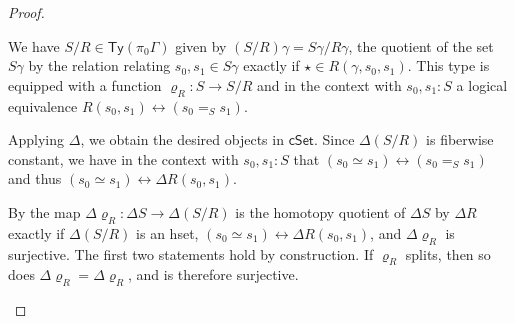 \documentclass[10pt,a4paper]{article}
\newcommand{\cSet}{\mathsf{cSet}}
\newcommand\Ty{\mathsf{Ty}}
\begin{document}
\begin{proof}
  \begin{description}[font=\normalfont,leftmargin=0cm]
  \item[\ref{prop:set-quotient-is-homotopy-quotient-iff-surjection-splits:well-defined}] 
    We have \(S/R \in \Ty(\pi_0\Gamma)\) given by \((S/R)\gamma = S\gamma / R\gamma\), the quotient of the set \(S\gamma\) by the relation relating \(s_0, s_1 \in S\gamma\) exactly if \(\star \in R(\gamma, s_0, s_1)\).
    This type is equipped with a function \(\varrho_R \colon S \to S/R\) and in the context with \(s_0, s_1 \colon S\) a logical equivalence \(R(s_0, s_1) \leftrightarrow (s_0 =_S s_1)\).

    Applying \(\Delta\), we obtain the desired objects in \(\cSet\).
    Since \(\Delta(S/R)\) is fiberwise constant, we have in the context with \(s_0, s_1 \colon S\) that \((s_0 \simeq s_1) \leftrightarrow (s_0 =_S s_1)\) and thus \((s_0 \simeq s_1) \leftrightarrow \Delta R(s_0, s_1)\).
  
  \item[\ref{prop:set-quotient-is-homotopy-quotient-iff-surjection-splits:characterization}] %
    By \cite[Theorem 18.2.3]{rijke2025intro} the map \(\Delta \varrho_{R} \colon \Delta S \to \Delta(S/R)\) is the homotopy quotient of \(\Delta S\) by \(\Delta R\) exactly if \(\Delta(S/R)\) is an hset, \((s_0 \simeq s_1) \leftrightarrow \Delta R(s_0, s_1)\), and \(\Delta \varrho_{R}\) is surjective.
    The first two statements hold by construction.
    If \(\varrho_R\) splits, then so does \(\Delta \varrho_{R} = \Delta \varrho_{R}\), and is therefore surjective.


\end{description}
\end{proof}
\end{document}
